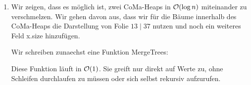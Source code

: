 \documentclass{scrartcl} %
\begin{document}
    \begin{aufgabe}
        \begin{enumerate}[label=(\alph*)]
            \item Wir zeigen, dass es möglich ist, zwei CoMa-Heaps in $\operatorname{\mathcal{O}}(\log n)$ miteinander zu verschmelzen. Wir gehen davon aus, dass wir für die Bäume innerhalb des CoMa-Heaps die Darstellung von Folie \href{https://isis.tu-berlin.de/pluginfile.php/3535837/mod_resource/content/2/Kapitel13.pdf}{$13\mid 37$} nutzen und noch ein weiteres Feld {\ttfamily x.size} hinzufügen.

            Wir schreiben zunaechst eine Funktion {\ttfamily MergeTrees}:
            
            \begin{algorithm}[H]
                \caption{\ttfamily mergeTrees(x, y)}
            \end{algorithm}
            Diese Funktion läuft in $\operatorname{\mathcal{O}}(1)$. Sie greift nur direkt auf Werte zu, ohne Schleifen durchlaufen zu müssen oder sich selbst rekursiv aufzurufen.
            

\end{enumerate}
\end{aufgabe}
\end{document}
